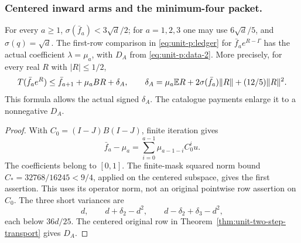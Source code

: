 \subsubsection{Centered inward arms and the minimum-four packet.}
\begin{lemma}\label{lem:unit-p:inward-path}
For every \(a\ge1\),
\(\sigma(\bar f_a)<3\sqrt d/2\); for \(a=1,2,3\) one may use
\(6\sqrt d/5\), and \(\sigma(q)=\sqrt d\).
The first-row comparison in \eqref{eq:unit-p:ledger} for
\(\bar f_ae^{R-\Gamma}\) has the actual coefficient
\(\lambda=\mu_a\), with \(D_A\) from \eqref{eq:unit-p:data-2}.
More precisely, for every real \(R\) with \(|R|\le1/2\),
\[
 T(\bar f_ae^R)\le\bar f_{a+1}+\mu_aBR+\delta_A,\qquad
 \delta_A=\mu_a\mathbb E R+2\sigma(\bar f_a)\|R\|
                                  +(12/5)\|R\|^2 .
\]
This formula allows the actual signed \(\delta_A\).
The catalogue payments enlarge it to a nonnegative \(D_A\).
\end{lemma}
\begin{proof}
With \(C_0=(I-J)B(I-J)\), finite iteration gives
\[
 \bar f_a-\mu_a
   =\sum_{i=0}^{a-1}\mu_{a-1-i}C_0^iu .
\]
The coefficients belong to \([0,1]\). The finite-mask squared norm
bound \(C_*=32768/16245<9/4\), applied on the centered subspace,
gives the first assertion. This uses its operator norm, not an
original pointwise row assertion on \(C_0\).
The three short variances are
\[
 d,\qquad d+\delta_2-d^2,\qquad
 d-\delta_2+\delta_3-d^2,
\]
each below \(36d/25\). The centered original row in
Theorem~\ref{thm:unit-two-step-transport} gives \(D_A\).
\end{proof}

